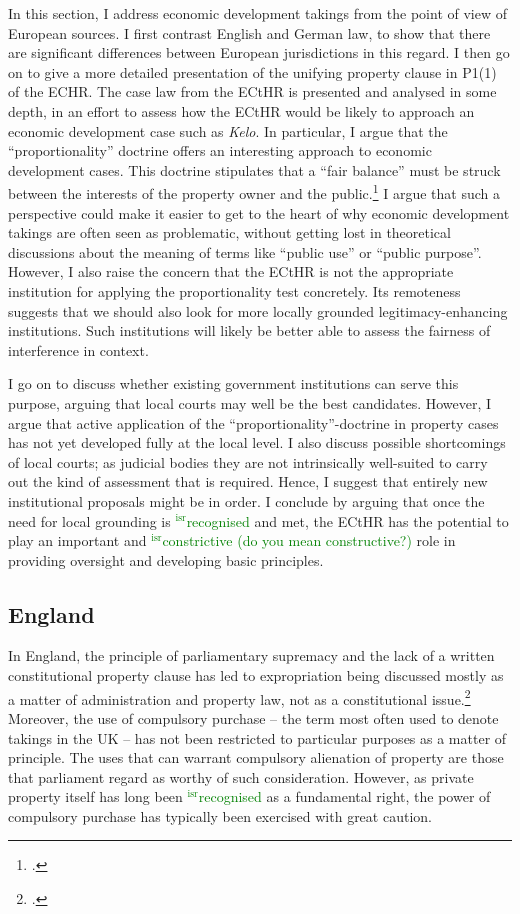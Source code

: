 \documentclass[12pt,a4paper]{book} %
\newcommand{\isr}[1]{\textcolor{green}{$^{\textrm{isr}}${#1}}}
\begin{document}
In this section, I address economic development takings from the point of view of European sources. I first contrast English and German law, to show that there are significant differences between European jurisdictions in this regard. I then go on to give a more detailed presentation of the unifying property clause in P1(1) of the ECHR. The case law from the ECtHR is presented and analysed in some depth, in an effort to assess how the ECtHR would be likely to approach an economic development case such as {\it Kelo}. In particular, I argue that the ``proportionality'' doctrine offers an interesting approach to economic development cases. This doctrine stipulates that a ``fair balance'' must be struck  between the interests of the property owner and the public.\footcite[Chapter 5]{allen05} I argue that such a perspective could make it easier to get to the heart of why economic development takings are often seen as problematic, without getting lost in theoretical discussions about the meaning of  terms like ``public use'' or ``public purpose''. However, I also raise the concern that the ECtHR is not the appropriate institution for applying the proportionality test concretely. Its remoteness suggests that we should also look for more locally grounded legitimacy-enhancing institutions. Such institutions will likely be better able to assess the fairness of interference in context.

I go on to discuss whether existing government institutions can serve this purpose, arguing that local courts may well be the best candidates. However, I argue that active application of the ``proportionality''-doctrine in property cases has not yet developed fully at the local level. I also discuss possible shortcomings of local courts; as judicial bodies they are not intrinsically well-suited to carry out the kind of assessment that is required. Hence, I suggest that entirely new institutional proposals might be in order. I conclude by arguing that once the need for local grounding is \isr{recognised} and met, the ECtHR has the potential to play an important and \isr{constrictive (do you mean constructive?)} role in providing oversight and developing basic principles.

\subsection{England}\label{sec:england}

In England, the principle of parliamentary supremacy and the lack of a written constitutional property clause has led to expropriation being discussed mostly as a matter of administration and property law, not as a constitutional issue.\footcite{taggart98} Moreover, the use of compulsory purchase -- the term most often used to denote takings in the UK -- has not been restricted to particular purposes as a matter of principle. The uses that can warrant compulsory alienation of property are those that parliament regard as worthy of such consideration. However, as private property itself has long been \isr{recognised} as a fundamental right, the power of compulsory purchase has typically been exercised with great caution. 
\end{document}
